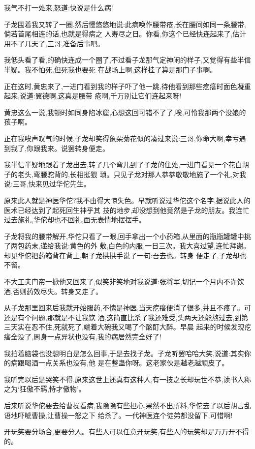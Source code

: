 ﻿\documentclass[12pt,twocolumn]{article}
\begin{document}
我气不打一处来,怒道:快说是什么病!

子龙围着我又转了一圈,然后慢悠悠地说:此病唤作腰带疮,长在腰间如同一条腰带,倘若首尾相连的话,也就是得病之
人寿尽之日。你看,你这个已经快连起来了,估计用不了几天了,三哥,准备后事吧。

我低头看了看,的确快连成一个圈了,不过看子龙那气定神闲的样子,又觉得有些半信半疑。我不怕死,但死我也要死
在战场上啊,这样挂了算是那门子事啊。

正在这时,黄忠来了,一进门看到我的样子吓了他一跳,待他看到那些疙瘩时面色凝重起来,说道:翼德啊,这真是腰带
疮啊,千万别让它们连起来呀!

黄忠这么一说,我顿时如同身陷冰窟,心想这回可错不了了,唉,可怜我那两个没娘的孩子啊。

正在我唉声叹气的时候,子龙却笑得象朵菊花似的凑过来说:三哥,你命大啊,幸亏遇到我了,你跟我来。说罢转身便走。

我半信半疑地跟着子龙出去,转了几个弯儿到了子龙的住处,一进门看见一个花白胡子的老头,弯腰驼背的,长相挺猥
琐。只见子龙对那人恭恭敬敬地施了一个礼,对我说:三哥,快来见过华佗先生。

原来此人就是神医华佗?我不由得大惊失色。早就听说过华佗这个名字,据说此人的医术已经达到了起死回生神乎其
技的地步,却没想到他竟然是子龙的朋友。我连忙过去施礼,华佗却也不回礼,面无表情地摆摆手。

子龙将我的腰带解开,华佗只看了一眼,回手拿出一个小药箱,从里面的瓶瓶罐罐中挑了两包药末,递给我说:黄色的外
敷,白色的内服,一日三次。我大喜过望,连忙拜谢。却见华佗把药箱背在背上,朝子龙拱拱手说了一句:吾去也。转身
便走了,子龙却也不留。

不大工夫门帘一掀他又回来了,似笑非笑地对我说道:张将军,切记一个月内不许饮酒,否则药效尽失。转身又走了。

从子龙那里回来后我就开始服药,不愧是神医,当天疙瘩便消了很多,并且不疼了。可还是有个问题,那就是不让我饮
酒,这简直比杀了我还难受,头两天还能熬过去,到第三天实在忍不住,死就死了,端着大碗我又喝了个酩酊大醉。早晨
起来的时候发现疙瘩全没了,周身一点异状也没有,我的病居然完全好了!

我拍着脑袋也没想明白是怎么回事,于是去找子龙。子龙听罢哈哈大笑,说道:其实你的病跟喝酒一点关系也没有,他
是在整蛊你呀。这老家伙是越老越顽皮了。

我听完以后是哭笑不得,原来这世上还真有这种人,有一技之长却玩世不恭,读书人称之为‘狂傲不羁,恃才傲物’。

后来听说华佗要去给曹操看病,我隐隐有些担心,果然不出所料,华佗去了以后胡言乱语地吓唬曹操,让曹操一怒之下
给杀了。一代神医连个徒弟都没留下,可惜啊!

开玩笑要分场合,更要分人。有些人可以任意开玩笑,有些人的玩笑却是万万开不得的。
\end{document}
